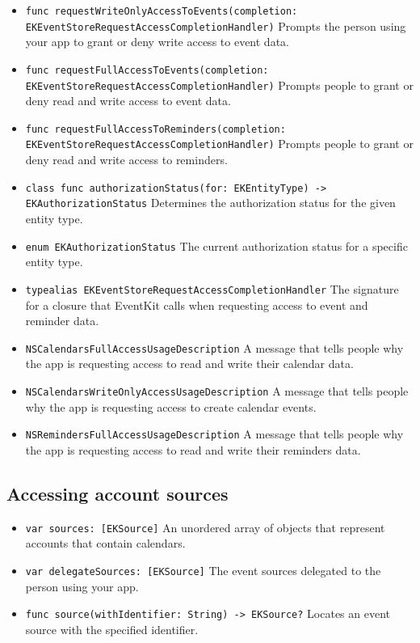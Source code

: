 \documentclass{article}
\begin{document}
\begin{itemize}
    \item \texttt{func requestWriteOnlyAccessToEvents(completion: EKEventStoreRequestAccessCompletionHandler)}
    Prompts the person using your app to grant or deny write access to event data.

    \item \texttt{func requestFullAccessToEvents(completion: EKEventStoreRequestAccessCompletionHandler)}
    Prompts people to grant or deny read and write access to event data.

    \item \texttt{func requestFullAccessToReminders(completion: EKEventStoreRequestAccessCompletionHandler)}
    Prompts people to grant or deny read and write access to reminders.

    \item \texttt{class func authorizationStatus(for: EKEntityType) -> EKAuthorizationStatus}
    Determines the authorization status for the given entity type.

    \item \texttt{enum EKAuthorizationStatus}
    The current authorization status for a specific entity type.

    \item \texttt{typealias EKEventStoreRequestAccessCompletionHandler}
    The signature for a closure that EventKit calls when requesting access to event and reminder data.

    \item \texttt{NSCalendarsFullAccessUsageDescription}
    A message that tells people why the app is requesting access to read and write their calendar data.

    \item \texttt{NSCalendarsWriteOnlyAccessUsageDescription}
    A message that tells people why the app is requesting access to create calendar events.

    \item \texttt{NSRemindersFullAccessUsageDescription}
    A message that tells people why the app is requesting access to read and write their reminders data.
\end{itemize}

\subsection*{Accessing account sources}

\begin{itemize}
    \item \texttt{var sources: [EKSource]}
    An unordered array of objects that represent accounts that contain calendars.

    \item \texttt{var delegateSources: [EKSource]}
    The event sources delegated to the person using your app.

    \item \texttt{func source(withIdentifier: String) -> EKSource?}
    Locates an event source with the specified identifier.
\end{itemize}
\end{document}

